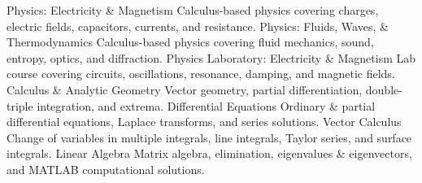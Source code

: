 \begin{cvskills}
\cvskill
    {Physics: Electricity \& Magnetism} %
    {Calculus-based physics covering charges, electric fields, capacitors, currents, and resistance.} %
\cvskill
    {Physics: Fluids, Waves, \& Thermodynamics} %
    {Calculus-based physics covering fluid mechanics, sound, entropy, optics, and diffraction.} %
\cvskill
    {Physics Laboratory: Electricity \& Magnetism} %
    {Lab course covering circuits, oscillations, resonance, damping, and magnetic fields.} %
\cvskill
    {Calculus \& Analytic Geometry} %
    {Vector geometry, partial differentiation, double-triple integration, and extrema.} %
\cvskill
    {Differential Equations} %
    {Ordinary \& partial differential equations, Laplace transforms, and series solutions.} %
\cvskill
    {Vector Calculus} %
    {Change of variables in multiple integrals, line integrals, Taylor series, and surface integrals.} %
\cvskill
    {Linear Algebra} %
    {Matrix algebra, elimination, eigenvalues \& eigenvectors, and MATLAB computational solutions.} %
\end{cvskills}

